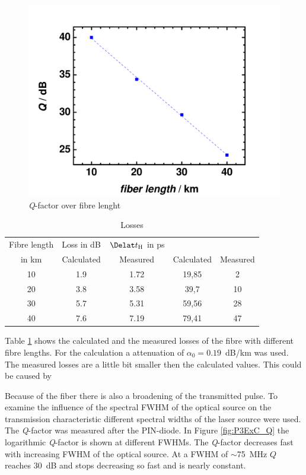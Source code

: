 {\begin{figure}%
\centering
\includegraphics[width=.5\columnwidth]{Grafiken/P3ExB_Q.pdf}%
\caption{\textit{Q}-factor over fibre lenght}%
\label{fig:P3ExB_Q}%
\end{figure}

\begin{table}%
\centering
\caption{Losses}
\begin{tabular}{ccccc}

\toprule
Fibre length & Loss in dB&$\Delat t_{\mathrm{H}}$ in ps&\\
in km&Calculated&Measured&Calculated&Measured\\
\midrule
10&	1.9&1.72&19,85	&2	\\
20&	3.8&3.58&39,7	&	10\\
30&	5.7&5.31&59,56	&	28\\
40&	7.6&7.19&79,41	&	47\\
\bottomrule 
\end{tabular}
\label{tab:P3ExB_loss}
\end{table}

Table \ref{tab:P3ExB_loss} shows the calculated and the measured losses of the fibre with different fibre lengths. For the calculation a attenuation of $\alpha_0=0.19$~dB/km was used. The measured losses are a little bit smaller then the calculated values. This could be caused by 

Because of the fiber there is also a broadening of the transmitted pulse. To examine the influence of the spectral FWHM of the optical source on the transmission characteristic different spectral widths of the laser source were used. The \textit{Q}-factor was measured after the PIN-diode. In Figure \ref{fig:P3ExC_Q} the logarithmic \textit{Q}-factor is shown at different FWHMs. The \textit{Q}-factor decreases fast with increasing FWHM of the optical source. At a FWHM of $\sim$75~MHz $Q$ reaches 30~dB and stops decreasing so fast and is nearly constant.

}
